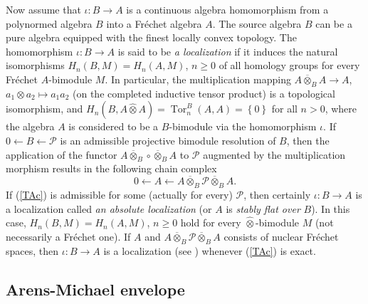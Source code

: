 \documentclass[12pt,reqno]{amsart}%
\theoremstyle{plain}
\numberwithin{theorem}{section} \numberwithin{equation}{section}
\numberwithin{lemma}{section}
\numberwithin{remark}{section}
\numberwithin{example}{section}
\numberwithin{proposition}{section}
\numberwithin{definition}{section}
\numberwithin{corollary}{section}
\begin{document}
Now assume that $\iota:B\rightarrow A$ is a continuous algebra homomorphism
from a polynormed algebra $B$ into a Fr\'{e}chet algebra $A$. The source
algebra $B$ can be a pure algebra equipped with the finest locally convex
topology. The homomorphism $\iota:B\rightarrow A$ is said to be \textit{a
localization} if it induces the natural isomorphisms $H_{n}\left(  B,M\right)
=H_{n}\left(  A,M\right)  $, $n\geq0$ of all homology groups for every
Fr\'{e}chet $A$-bimodule $M$. In particular, the multiplication mapping
$A\overline{\otimes}_{B}A\rightarrow A$, $a_{1}\otimes a_{2}\mapsto a_{1}%
a_{2}$ (on the completed inductive tensor product) is a topological
isomorphism, and $H_{n}\left(  B,A\widehat{\otimes}A\right)
=\operatorname{Tor}_{n}^{B}\left(  A,A\right)  =\left\{  0\right\}  $ for all
$n>0$, where the algebra $A$ is considered to be a $B$-bimodule via the
homomorphism $\iota$. If $0\leftarrow B\longleftarrow\mathcal{P}$ is an
admissible projective bimodule resolution of $B$, then the application of the
functor $A\overline{\otimes}_{B}\circ\overline{\otimes}_{B}A$ to $\mathcal{P}$
augmented by the multiplication morphism results in the following chain
complex
\begin{equation}
0\leftarrow A\longleftarrow A\overline{\otimes}_{B}\mathcal{P}\overline
{\otimes}_{B}A. \label{TAc}%
\end{equation}
If (\ref{TAc}) is admissible for some (actually for every) $\mathcal{P}$, then
certainly $\iota:B\rightarrow A$ is a localization called \textit{an absolute
localization }(or $A$ is \textit{stably flat over} $B$). In this case,
$H_{n}\left(  B,M\right)  =H_{n}\left(  A,M\right)  $, $n\geq0$ hold for every
$\widehat{\otimes}$-bimodule $M$ (not necessarily a Fr\'{e}chet one). If $A$
and $A\overline{\otimes}_{B}\mathcal{P}\overline{\otimes}_{B}A$ consists of
nuclear Fr\'{e}chet spaces, then $\iota:B\rightarrow A$ is a localization (see
\cite[Proposition 1.6]{Tay2}) whenever (\ref{TAc}) is exact.

\subsection{Arens-Michael envelope\label{subsecAME}}
\end{document}
